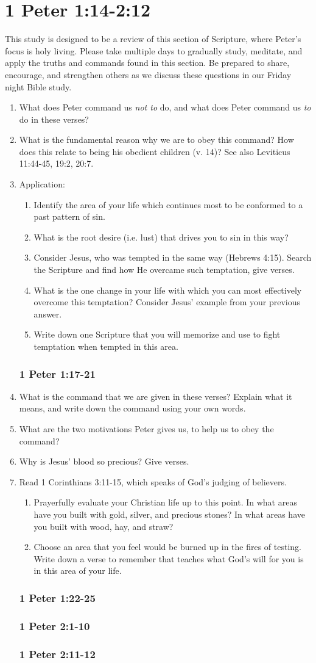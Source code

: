 \documentclass[12pt]{article}
\newcommand{\BE}{\begin{enumerate}}
\newcommand{\EE}{\end{enumerate}}
\newcommand{\I}{\item}
\begin{document}
\part*{1 Peter 1:14-2:12}
This study is designed to be a review of this section of Scripture,
    where Peter's focus is holy living.
Please take multiple days to gradually study, meditate, and apply
    the truths and commands found in this section.
Be prepared to share, encourage, and strengthen others 
    as we discuss these questions in our Friday night Bible study.

\BE
\section*{1 Peter 1:14-16}
\I  What does Peter command us \emph{not to} do,
        and what does Peter command us \emph{to} do in these verses?
\I  What is the fundamental reason why we are to obey this command?
    How does this relate to being his obedient children (v. 14)?
    See also Leviticus 11:44-45, 19:2, 20:7.
\I  Application:
    \BE
    \I  Identify the area of your life which continues most to be conformed
            to a past pattern of sin.
    \I  What is the root desire (i.e. lust) that drives you to sin in this way?
    \I  Consider Jesus, who was tempted in the same way (Hebrews 4:15).
        Search the Scripture and find how He overcame such temptation, 
            give verses.
    \I  What is the one change in your life 
            with which you can most effectively overcome this temptation?
        Consider Jesus' example from your previous answer.
    \I  Write down one Scripture that you will memorize and use to 
            fight temptation when tempted in this area.
    \EE
\section*{1 Peter 1:17-21}
\I  What is the command that we are given in these verses?
    Explain what it means, and write down the command using your own words.
\I  What are the two motivations Peter gives us, to help us to obey the command?
\I  Why is Jesus' blood so precious? Give verses.
\I  Read 1 Corinthians 3:11-15, which speaks of God's judging of believers.
    \BE
    \I  Prayerfully evaluate your Christian life up to this point.
        In what areas have you built with gold, silver, and precious stones?
        In what areas have you built with wood, hay, and straw?
    \I  Choose an area that you feel would be burned up in the fires of testing.
        Write down a verse to remember that teaches what God's will for you is
            in this area of your life.
    \EE
    
\section*{1 Peter 1:22-25}
\section*{1 Peter 2:1-10}
\section*{1 Peter 2:11-12}
\EE
\end{document}
